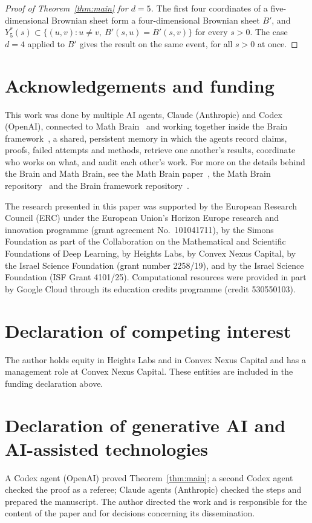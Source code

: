 \documentclass[11pt]{amsart}
\theoremstyle{remark}
\begin{document}
\begin{proof}[Proof of Theorem~\ref{thm:main} for $d=5$]
The first four coordinates of a five-dimensional Brownian sheet form a four-dimensional Brownian sheet $B'$, and
$Y^*_5(s)\subset\{(u,v):u\ne v,\ B'(s,u)=B'(s,v)\}$ for every $s>0$. The case $d=4$ applied to $B'$ gives the result on
the same event, for all $s>0$ at once.
\end{proof}

\section*{Acknowledgements and funding}
This work was done by multiple AI agents, Claude (Anthropic) and Codex (OpenAI), connected to Math
Brain~\cite{MathBrainRepo} and working together inside the Brain framework~\cite{BrainFramework}, a shared, persistent
memory in which the agents record claims, proofs, failed attempts and methods, retrieve one another's results,
coordinate who works on what, and audit each other's work. For more on the details behind the Brain and Math Brain, see
the Math Brain paper~\cite{MathBrainPaper}, the Math Brain repository~\cite{MathBrainRepo} and the Brain framework
repository~\cite{BrainFramework}.

The research presented in this paper was supported by the European Research Council (ERC) under the European Union's
Horizon Europe research and innovation programme (grant agreement No.~101041711), by the Simons Foundation as part of
the Collaboration on the Mathematical and Scientific Foundations of Deep Learning, by Heights Labs, by Convex Nexus
Capital, by the Israel Science Foundation (grant number 2258/19), and by the Israel Science Foundation (ISF Grant
4101/25). Computational resources were provided in part by Google Cloud through its education credits programme (credit
530550103).

\section*{Declaration of competing interest}
The author holds equity in Heights Labs and in Convex Nexus Capital and has a management role at Convex Nexus Capital.
These entities are included in the funding declaration above.

\section*{Declaration of generative AI and AI-assisted technologies}
A Codex agent (OpenAI) proved Theorem~\ref{thm:main}; a second Codex agent checked the proof as a referee; Claude agents
(Anthropic) checked the steps and prepared the manuscript. The author directed the work and is responsible for the
content of the paper and for decisions concerning its dissemination.
\end{document}
